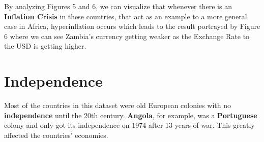 \documentclass{article}
\begin{document}
    By analyzing Figures 5 and 6, we can visualize that whenever there is an 
    \textbf{Inflation Crisis} in these countries, 
    that act as an example to a more general case in Africa, 
    hyperinflation occurs which leads to the result portrayed by Figure 6 
    where we can see Zambia's currency getting weaker as the Exchange Rate to the USD
    is getting higher.

    \newpage
    \section{ Independence }
    Most of the countries in this dataset were old European colonies with no \textbf{independence}
    until the 20th century. \textbf{Angola}, for example, was a \textbf{Portuguese} colony 
    and only got its independence on 1974 after 13 years of war. This greatly affected the
    countries' economies.
\end{document}
